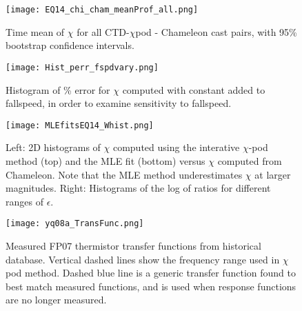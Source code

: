 \documentclass{ametsoc}
\begin{document}
\begin{figure}[t]
  \noindent\texttt{[image: EQ14\_chi\_cham\_meanProf\_all.png]}\\
  \caption{Time mean of $\chi$ for all CTD-$\chi$pod - Chameleon cast pairs, with 95\% bootstrap confidence intervals.}
  \label{ctd_cham_chi_boot_all}
\end{figure}


\begin{figure}[t]
  \noindent\texttt{[image: Hist\_perr\_fspdvary.png]}\\
  \caption{Histogram of \% error for $\chi$ computed with constant added to fallspeed, in order to examine sensitivity to fallspeed.}
  \label{FspdSensHist}
\end{figure}


\begin{figure}[t]
  \noindent\texttt{[image: MLEfitsEQ14\_Whist.png]}\\
  \caption{Left: 2D histograms of $\chi$ computed using the interative $\chi$-pod method (top) and the MLE fit (bottom) versus $\chi$ computed from Chameleon. Note that the MLE method underestimates $\chi$ at larger magnitudes. Right: Histograms of the log of ratios for different ranges of $\epsilon$.}
  \label{mlefits}
\end{figure}


\begin{figure}[t]
  \noindent\texttt{[image: yq08a\_TransFunc.png]}\\
  \caption{Measured FP07 thermistor transfer functions from historical database. Vertical dashed lines show the frequency range used in $\chi$pod method. Dashed blue line is a generic transfer function found to best match measured functions, and is used when response functions are no longer measured.}
  \label{xfr}
\end{figure}
\end{document}
